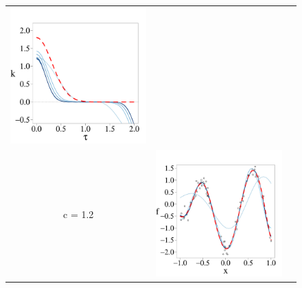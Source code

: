 \documentclass[onecolumn,a4paper,11pt]{article}
\begin{document}
\begin{figure}
\begin{tabular}{ c c c }
\includegraphics[scale=0.215, trim = 0mm 14mm 5mm 14mm, clip]{ch5_fig3_Cov_part2.pdf} &\\
\cline{1-2}
c = 1.2 &
\includegraphics[scale=0.215, trim = 0mm 14mm 0mm 14mm, clip]{ch5_fig3_Post_part3.pdf} 

\end{tabular}
\end{figure}
\end{document}
